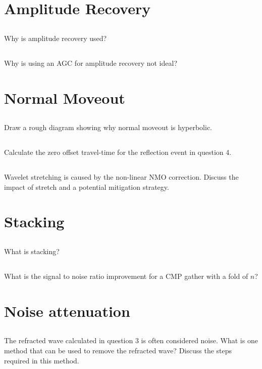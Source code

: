 \documentclass[a4paper, 10pt]{article}
\begin{document}
\section{Amplitude Recovery}
\subsection{}
Why is amplitude recovery used?
\subsection{}
Why is using an AGC for amplitude recovery not ideal?
\section{Normal Moveout}
\subsection{}
Draw a rough diagram showing why normal moveout is hyperbolic.
\subsection{}
Calculate the zero offset travel-time for the reflection event in question 4.
\subsection{}
Wavelet stretching is caused by the non-linear NMO correction. Discuss the impact of stretch and a potential mitigation strategy.
\section{Stacking}
\subsection{}
What is stacking?  
\subsection{}
What is the signal to noise ratio improvement for a CMP gather with a fold of $n$?
\section{Noise attenuation}
\subsection{}
The refracted wave calculated in question 3 is often considered noise.  What is one method that can be used to remove the refracted wave? Discuss the steps required in this method.
\end{document}
